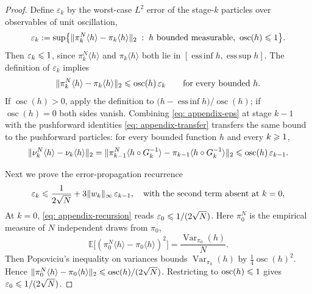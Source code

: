 \documentclass{article}
\begin{document}
\begin{proof}
Define $\varepsilon_k$ by the worst-case $L^2$ error of the stage-$k$ particles over observables of unit oscillation,
\begin{equation}
    \varepsilon_k := \sup\bigl\{\lVert\pi_k^N\langle h\rangle-\pi_k\langle h\rangle\rVert_2
    \;:\; h\text{ bounded measurable},\ \operatorname{osc}(h)\leqslant1\bigr\} .
    \label{eq: appendix-eps-def}
\end{equation}
Then $\varepsilon_k\leqslant1$, since $\pi_k^N\langle h\rangle$ and $\pi_k\langle h\rangle$ both lie in $[\operatorname{ess\,inf}h,\operatorname{ess\,sup}h]$. The definition of $\varepsilon_k$ implies
\begin{equation}
    \lVert\pi_k^N\langle h\rangle-\pi_k\langle h\rangle\rVert_2 \leqslant \operatorname{osc}(h)\,\varepsilon_k
    \qquad\text{for every bounded } h.
    \label{eq: appendix-eps}
\end{equation}
If $\operatorname{osc}(h)>0$, apply the definition to $\bigl(h-\operatorname{ess\,inf}h\bigr)/\operatorname{osc}(h)$; if $\operatorname{osc}(h)=0$ both sides vanish.
Combining \eqref{eq: appendix-eps} at stage $k-1$ with the pushforward identities \eqref{eq: appendix-transfer} transfers the same bound to the pushforward particles: for every bounded function $h$ and every $k\geqslant1$,
\begin{equation}
    \lVert\nu_k^N\langle h\rangle-\nu_k\langle h\rangle\rVert_2
    = \lVert\pi_{k-1}^N\langle h\circ G_k^{-1}\rangle-\pi_{k-1}\langle h\circ G_k^{-1}\rangle\rVert_2
    \leqslant \operatorname{osc}(h)\,\varepsilon_{k-1} .
    \label{eq: appendix-transferred}
\end{equation}

Next we prove the error-propagation recurrence
\begin{equation}
    \varepsilon_k \leqslant \frac{1}{2\sqrt N} + 3\lVert w_k\rVert_\infty\,\varepsilon_{k-1},
    \quad\text{with the second term absent at } k=0,
    \label{eq: appendix-recursion}
\end{equation}
At $k=0$, \eqref{eq: appendix-recursion} reads $\varepsilon_0\leqslant1/(2\sqrt N)$. Here $\pi_0^N$ is the empirical measure of $N$ independent draws from $\pi_0$,
\begin{equation*}
    \mathbb E\bigl[(\pi_0^N\langle h\rangle-\pi_0\langle h\rangle)^{2}\bigr]
    = \frac{\operatorname{Var}_{\pi_0}(h)}{N} .
\end{equation*}
Then Popoviciu's inequality on variances \citep{popoviciu1935equations} bounds $\operatorname{Var}_{\pi_0}(h)$ by $\frac14\operatorname{osc}(h)^2$. Hence $\lVert\pi_0^N\langle h\rangle-\pi_0\langle h\rangle\rVert_2 \leqslant \operatorname{osc}(h)/(2\sqrt N)$. Restricting to $\operatorname{osc}(h)\leqslant1$ gives $\varepsilon_0\leqslant 1/(2\sqrt N)$.


\end{proof}
\end{document}
